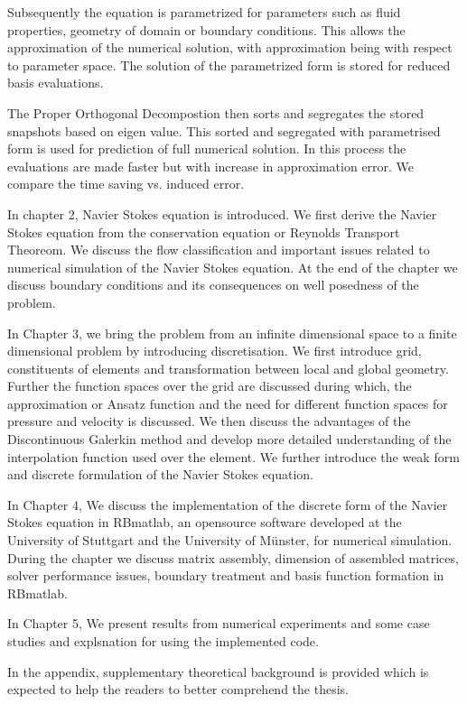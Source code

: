 \documentclass[a4paper,12pt]{book}
\begin{document}
Subsequently the equation is parametrized for parameters such as fluid properties, geometry of domain or boundary conditions. This allows the approximation of the numerical solution, with approximation being with respect to parameter space. The solution of the parametrized form is stored for reduced basis evaluations.

The Proper Orthogonal Decompostion then sorts and segregates the stored  snapshots based on eigen value. This sorted and segregated with parametrised form is used for prediction of full numerical solution. In this process the evaluations are made faster but with increase in approximation error. We compare the time saving vs. induced error.

In chapter 2, Navier Stokes equation is introduced. We first derive the Navier Stokes equation from the conservation equation or Reynolds Transport Theoreom. We discuss the flow classification and important issues related to numerical simulation of the Navier Stokes equation. At the end of the chapter we discuss boundary conditions and its consequences on well posedness of the problem.

In Chapter 3, we bring the problem from an infinite dimensional space to a finite dimensional problem by introducing discretisation. We first introduce grid, constituents of elements and transformation between local and global geometry. Further the function spaces over the grid are discussed during which, the approximation or Ansatz function and the need for different function spaces for pressure and velocity is discussed. We then discuss the advantages of the Discontinuous Galerkin method and develop more detailed understanding of the interpolation function used over the element. We further introduce the weak form and discrete formulation of the Navier Stokes equation.

In Chapter 4, We discuss the implementation of the discrete form of the Navier Stokes equation in RBmatlab, an opensource software developed at the University of Stuttgart and the University of M\"unster, for numerical simulation. During the chapter we discuss matrix assembly, dimension of assembled matrices, solver performance issues, boundary treatment and basis function formation in RBmatlab.

In Chapter 5, We present results from numerical experiments and some case studies and explsnation for using the implemented code.

In the appendix, supplementary theoretical background is provided which is expected to help the readers to better comprehend the thesis.
\end{document}
